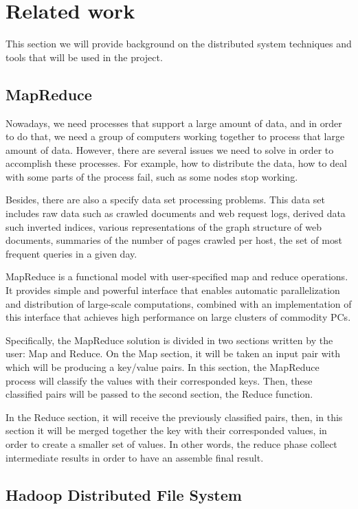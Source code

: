
\label{sec:relatedWork}
\section{Related work}
This section we will provide background on the distributed system techniques and tools that will be used in the project.

\subsection{MapReduce}
Nowadays, we need processes that support a large amount of data, and in order to do that, we need a group of computers working together to process that large amount of data. However, there are several issues we need to solve in order to accomplish these processes. For example, how to distribute the data, how to deal with some parts of the process fail, such as some nodes stop working.

Besides, there are also a specify data set processing problems. This data set includes raw data such as crawled documents and web request logs, derived data such inverted indices, various representations of the graph structure of web documents, summaries of the number of pages crawled per host, the set of most frequent queries in a given day. 

MapReduce is a functional model with user-specified map and reduce operations. It provides simple and powerful interface that enables automatic parallelization and distribution of large-scale computations, combined with an implementation of this interface that achieves high performance on large clusters of commodity PCs.

Specifically, the MapReduce solution is divided in two sections written by the user: Map and Reduce. On the Map section, it will be taken an input pair with which will be producing a key/value pairs. In this section, the MapReduce process will classify the values with their corresponded keys. Then, these classified pairs will be passed to the second section, the Reduce function.

In the Reduce section, it will receive the previously classified pairs, then, in this section it will be merged together the key with their corresponded values, in order to create a smaller set of values. In other words, the reduce phase collect intermediate results in order to have an assemble final result. \cite{dean2008mapreduce}

\subsection{Hadoop Distributed File System}

